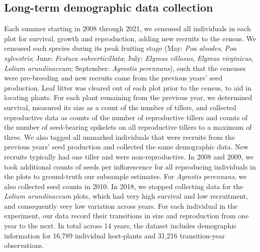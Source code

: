 \documentclass[9pt,twocolumn,twoside]{pnas-new}
\begin{document}
{\subsection*{Long-term demographic data collection}
Each summer starting in 2008 through 2021, we censused all individuals in each plot for survival, growth and reproduction,  adding new recruits to the census.
We censused each species during its peak fruiting stage (May: \emph{Poa alsodes}, \emph{Poa sylvestris}; June: \emph{Festuca subverticillata}; July: \emph{Elymus villosus}, \emph{Elymus virginicus}, \emph{Lolium arundinaceum}; September: \emph{Agrostis perennans}), such that the censuses were pre-breeding and new recruits came from the previous years' seed production.
Leaf litter was cleared out of each plot prior to the census, to aid in locating plants.
For each plant remaining from the previous year, we determined survival, measured its size as a count of the number of tillers, and collected reproductive data as counts of the number of reproductive tillers and counts of the number of seed-bearing spikelets on all reproductive tillers to a maximum of three. 
We also tagged all unmarked individuals that were recruits from the previous years' seed production and collected the same demographic data.
New recruits typically had one tiller and were non-reproductive. 
In 2008 and 2009, we took additional counts of seeds per inflorescence for all reproducing individuals in the plots to ground-truth our subsample estimates. 
For \emph{Agrostis perennans}, we also collected seed counts in 2010.
In 2018, we stopped collecting data for the \emph{Lolium arundinaceum} plots, which had very high survival and low recruitment, and consequently very low variation across years.
For each individual in the experiment, our data record their transitions in size and reproduction from one year to the next. 
In total across 14 years, the dataset includes demographic information for 16,789 individual host-plants and 31,216 transition-year observations.

}
\end{document}
